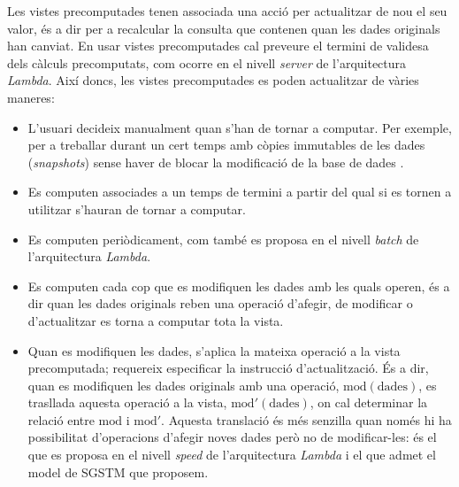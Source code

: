 Les vistes precomputades tenen associada una acció per actualitzar de
nou el seu valor, és a dir per a recalcular la consulta que contenen
quan les dades originals han canviat. En usar vistes precomputades cal
preveure el termini de validesa dels càlculs precomputats, com ocorre
en el nivell \emph{server} de l'arquitectura \emph{Lambda}. Així
doncs, les vistes precomputades es poden actualitzar de vàries
maneres:
\begin{itemize}

\item L'usuari decideix manualment quan s'han de tornar a computar. Per
  exemple, per a treballar durant un cert temps amb còpies immutables
  de les dades (\emph{snapshots}) sense haver de blocar la modificació
  de la base de dades \cite[\S{}10.5]{date04:introduction8}.

\item Es computen associades a un temps de termini a partir del qual
  si es tornen a utilitzar s'hauran de tornar a computar. \todo{}

\item Es computen periòdicament, com també es proposa en el nivell
  \emph{batch} de l'arquitectura \emph{Lambda}.

\item Es computen cada cop que es modifiquen les dades amb les quals
  operen, és a dir quan les dades originals reben una operació
  d'afegir, de modificar o d'actualitzar es torna a computar tota la
  vista.

\item Quan es modifiquen les dades, s'aplica la mateixa operació a la
  vista precomputada; requereix especificar la instrucció
  d'actualització. És a dir, quan es modifiquen les dades originals
  amb una operació, $\text{mod}(\text{dades})$, es trasllada aquesta
  operació a la vista, $\text{mod}'(\text{dades})$, on cal determinar
  la relació entre $\text{mod}$ i $\text{mod}'$.  Aquesta translació
  és més senzilla quan només hi ha possibilitat d'operacions d'afegir
  noves dades però no de modificar-les: és el que es proposa en el
  nivell \emph{speed} de l'arquitectura \emph{Lambda} i el que admet
  el model de \gls{SGSTM} que proposem. 
\end{itemize}



